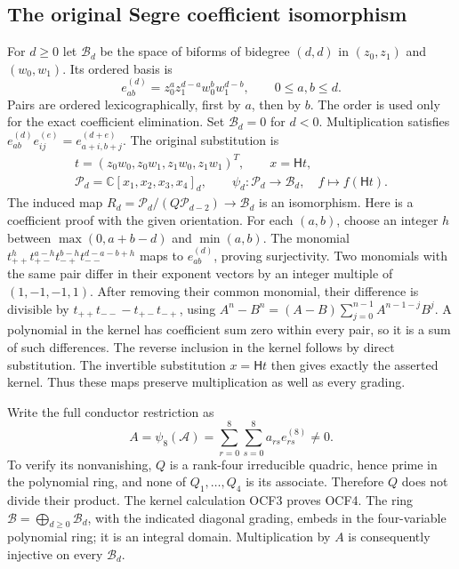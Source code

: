 \documentclass[11pt]{article}
\begin{document}
\subsection{The original Segre coefficient isomorphism}

For $d\geq0$ let $\mathcal B_d$ be the space of biforms of
bidegree $(d,d)$ in $(z_0,z_1)$ and $(w_0,w_1)$. Its ordered basis is
\[
 e_{ab}^{(d)}=z_0^a z_1^{d-a}w_0^b w_1^{d-b},
 \qquad 0\leq a,b\leq d.
 \tag{OCF2}
\]
Pairs are ordered lexicographically, first by $a$, then by $b$.
The order is used only for the exact coefficient elimination.
Set $\mathcal B_d=0$ for $d<0$. Multiplication satisfies
$e_{ab}^{(d)}e_{ij}^{(e)}=e_{a+i,b+j}^{(d+e)}$.
The original substitution is
\[
 \begin{gathered}
 t=(z_0w_0,z_0w_1,z_1w_0,z_1w_1)^T,\qquad x=\mathsf Ht,\\
 \mathscr P_d=\mathbb C[x_1,x_2,x_3,x_4]_d,\qquad
 \psi_d:\mathscr P_d\longrightarrow\mathcal B_d,\quad
 f\longmapsto f(\mathsf Ht).
 \end{gathered}\tag{OCF3}
\]
The induced map
$R_d=\mathscr P_d/(Q\mathscr P_{d-2})\longrightarrow\mathcal B_d$
is an isomorphism. Here is a coefficient proof with the given
orientation. For each $(a,b)$, choose an integer
$h$ between $\max(0,a+b-d)$ and $\min(a,b)$. The monomial
$t_{++}^{h}t_{+-}^{a-h}t_{-+}^{b-h}t_{--}^{d-a-b+h}$ maps
to $e_{ab}^{(d)}$, proving surjectivity. Two monomials with
the same pair differ in their exponent vectors by an integer
multiple of $(1,-1,-1,1)$. After removing their common monomial,
their difference is divisible by $t_{++}t_{--}-t_{+-}t_{-+}$,
using $A^n-B^n=(A-B)\sum_{j=0}^{n-1}A^{n-1-j}B^j$.
A polynomial in the kernel has coefficient sum zero within every
pair, so it is a sum of such differences. The reverse inclusion
in the kernel follows by direct substitution. The invertible
substitution $x=\mathsf Ht$ then gives exactly the asserted kernel.
Thus these maps preserve multiplication as well as every grading.

Write the full conductor restriction as
\[
 A=\psi_8(\mathcal A)
     =\sum_{r=0}^8\sum_{s=0}^8 a_{rs}e_{rs}^{(8)}\ne0.
 \tag{OCF4}
\]
To verify its nonvanishing, $Q$ is a rank-four irreducible quadric,
hence prime in the polynomial ring, and none of $Q_1,\ldots,Q_4$
is its associate. Therefore $Q$ does not divide their product.
The kernel calculation OCF3 proves OCF4. The ring
$\mathcal B=\bigoplus_{d\geq0}\mathcal B_d$, with the indicated
diagonal grading, embeds in the four-variable polynomial ring;
it is an integral domain. Multiplication by $A$ is consequently
injective on every $\mathcal B_d$.
\end{document}

